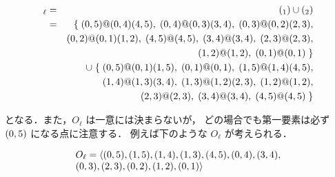 {{\small
\begin{eqnarray*}
	\wfst_\ell&=&\wfst(\rseq_1)\cup\wfst(\rseq_2)\\
		&=&
		\{\;\sym{S}(0,5)@\sym{PP}(0,4)\sym{V}(4,5),\;
			\sym{PP}(0,4)@\sym{NP}(0,3)\sym{P}(3,4),\;
			\sym{NP}(0,3)@\sym{VP}(0,2)\sym{N}(2,3),\\
		&&\q\sym{VP}(0,2)@\sym{ADV}(0,1)\sym{V}(1,2),\;
			\sym{V}(4,5)@\sym{見た}(4,5),\;
			\sym{P}(3,4)@\sym{を}(3,4),\;
			\sym{N}(2,3)@\sym{一郎}(2,3),\\
		&&\q\sym{V}(1,2)@\sym{走る}(1,2),\;
			\sym{ADV}(0,1)@\sym{急いで}(0,1)\;\}\\
		&&\cup\;
		\{\;\sym{S}(0,5)@\sym{ADV}(0,1)\sym{VP}(1,5),\;
			\sym{ADV}(0,1)@\sym{急いで}(0,1),\;
			\sym{VP}(1,5)@\sym{PP}(1,4)\sym{V}(4,5),\\
		&&\q\q
			\sym{PP}(1,4)@\sym{NP}(1,3)\sym{P}(3,4),\;
			\sym{NP}(1,3)@\sym{V}(1,2)\sym{N}(2,3),\;
			\sym{V}(1,2)@\sym{走る}(1,2),\\
		&&\q\q
			\sym{N}(2,3)@\sym{一郎}(2,3),\;
			\sym{P}(3,4)@\sym{を}(3,4),\;
			\sym{V}(4,5)@\sym{見た}(4,5)\;\}
\end{eqnarray*}
}

\noindent
となる．また，$O_\ell$ は一意には決まらないが，
どの場合でも第一要素は必ず $\sym{S}(0,5)$ になる点に注意する．
例えば下のような $O_\ell$ が考えられる．

{\small
\[
	\begin{array}{l}
	O_\ell=
	\langle
	\sym{S}(0,5),
	\sym{VP}(1,5),
	\sym{PP}(1,4),
	\sym{NP}(1,3),
	\sym{V}(4,5),
	\sym{PP}(0,4),
	\sym{P}(3,4),
	\\
	\q\q\q
	\sym{NP}(0,3),
	\sym{N}(2,3),
	\sym{VP}(0,2),
	\sym{V}(1,2),
	\sym{ADV}(0,1)
	\rangle
	\end{array}
\]
}

}
